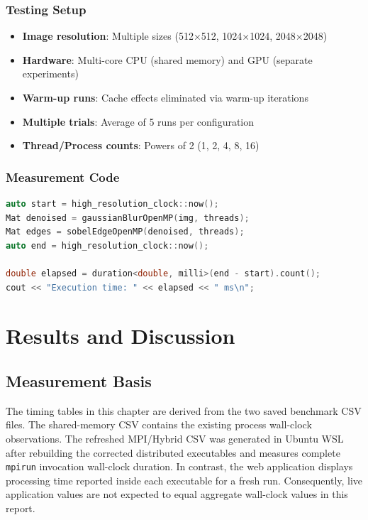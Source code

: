 \documentclass[12pt,a4paper]{report}
\begin{document}
\subsection{Testing Setup}
\begin{itemize}
    \item \textbf{Image resolution}: Multiple sizes (512×512, 1024×1024, 2048×2048)
    \item \textbf{Hardware}: Multi-core CPU (shared memory) and GPU (separate experiments)
    \item \textbf{Warm-up runs}: Cache effects eliminated via warm-up iterations
    \item \textbf{Multiple trials}: Average of 5 runs per configuration
    \item \textbf{Thread/Process counts}: Powers of 2 (1, 2, 4, 8, 16)
\end{itemize}

\subsection{Measurement Code}

\begin{lstlisting}[language=C++, caption=Timing Measurement]
auto start = high_resolution_clock::now();
Mat denoised = gaussianBlurOpenMP(img, threads);
Mat edges = sobelEdgeOpenMP(denoised, threads);
auto end = high_resolution_clock::now();

double elapsed = duration<double, milli>(end - start).count();
cout << "Execution time: " << elapsed << " ms\n";
\end{lstlisting}

\newpage

\chapter{Results and Discussion}

\section{Measurement Basis}

The timing tables in this chapter are derived from the two saved benchmark CSV files.
The shared-memory CSV contains the existing process wall-clock observations. The refreshed
MPI/Hybrid CSV was generated in Ubuntu WSL after rebuilding the corrected distributed
executables and measures complete \texttt{mpirun} invocation wall-clock duration. In contrast,
the web application displays processing time reported inside each executable for a fresh run.
Consequently, live application values are not expected to equal aggregate wall-clock values
in this report.
\end{document}
